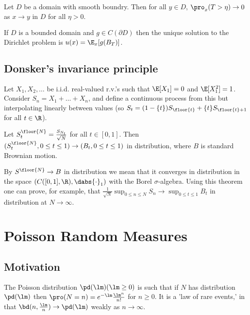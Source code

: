 \begin{lemma}
Let $D$ be a domain with smooth boundry. Then for all $y \in D$, $\pro_x (T > \eta)\to 0$ as $x \to y$ in $D$ for all $\eta > 0$.
\end{lemma}

\begin{corollary}
If $D$ is a bounded domain and $g \in C(\partial D)$ then the unique solution to the Dirichlet problem is $u(x) = \E_x [g(B_T )]$.
\end{corollary}

\subsection{Donsker's invariance principle}

Let $X_1, X_2, \dots$ be i.i.d. real-valued r.v.'s such that $\E[X_1] = 0$ and $\E[X^2_1] = 1$. Consider $S_n = X_1+\dots+X_n$, and define a continuous process from this but interpolating linearly between values (so $S_t = (1-\{t\})S_{\floor{t}} + \{t\}S_{\floor{t}+1}$ for all $t \in \R$).

\begin{theorem}
Let $S^{\floor{N}}_t = \frac{S_{N_t}}{\sqrt{N}}$ for all $t \in [0, 1]$. Then $(S^{\floor{N}}_t , 0 \leq t \leq 1) \to (B_t , 0 \leq t \leq 1)$ in distribution, where $B$ is standard Brownian motion.

By $S^{\floor{N}}\to B$ in distribution we mean that it converges in distribution in the space $(C([0, 1],\R), \dabs{ \cdot }_1)$ with the Borel $\sigma$-algebra. Using this theorem one can prove, for example, that $\frac 1{\sqrt{N}} \sup_{0\leq n\leq N} S_n \to \sup_{0\leq t\leq 1} B_t$ in distribution at $N \to \infty$.
\end{theorem}


\section{Poisson Random Measures}

\subsection{Motivation}

The Poisson distribution $\pd(\lm) (\lm \geq 0)$ is such that if $N$ has distribution $\pd(\lm)$ then $\pro(N = n) = e^{-\lm} \frac{\lm^n}{n!}$ for $n \geq 0$. It is a 'law of rare events,' in that $\bd(n, \frac {\lm}n )\to \pd (\lm)$ weakly as $n\to \infty$.


